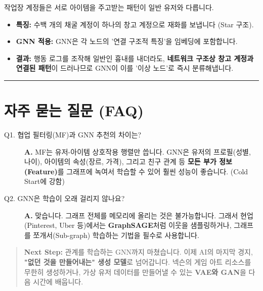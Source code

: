 \documentclass[11pt,a4paper]{book}
\theoremstyle{definition}
\begin{document}
\begin{storybox}[title={Scenario 2: 작업장 탐지 (Node Classification)}]
작업장 계정들은 서로 아이템을 주고받는 패턴이 일반 유저와 다릅니다.
\end{storybox}
\begin{itemize}
    \item \textbf{특징:} 수백 개의 채굴 계정이 하나의 창고 계정으로 재화를 보냅니다 (Star 구조).
    \item \textbf{GNN 적용:} GNN은 각 노드의 '연결 구조적 특징'을 임베딩에 포함합니다.
    \item \textbf{결과:} 행동 로그를 조작해 일반인 흉내를 내더라도, \textbf{네트워크 구조상 창고 계정과 연결된 패턴}이 드러나므로 GNN이 이를 '이상 노드'로 즉시 분류해냅니다.
\end{itemize}

\vspace{0.5cm}\hrule\vspace{0.5cm}

\section{자주 묻는 질문 (FAQ)}

\begin{description}
    \item[Q1. 협업 필터링(MF)과 GNN 추천의 차이는?]
    \textbf{A.} MF는 유저-아이템 상호작용 행렬만 씁니다. GNN은 유저의 프로필(성별, 나이), 아이템의 속성(장르, 가격), 그리고 친구 관계 등 \textbf{모든 부가 정보(Feature)}를 그래프에 녹여서 학습할 수 있어 훨씬 성능이 좋습니다. (Cold Start에 강함)
    
    \item[Q2. GNN은 학습이 오래 걸리지 않나요?]
    \textbf{A.} 맞습니다. 그래프 전체를 메모리에 올리는 것은 불가능합니다. 그래서 현업(Pinterest, Uber 등)에서는 \textbf{GraphSAGE}처럼 이웃을 샘플링하거나, 그래프를 쪼개서(Sub-graph) 학습하는 기법을 필수로 사용합니다.
\end{description}

\vspace{1cm}
\begin{quote}
\textbf{Next Step:} 관계를 학습하는 GNN까지 마쳤습니다. 이제 AI의 마지막 경지, \textbf{"없던 것을 만들어내는" 생성 모델}로 넘어갑니다. 넥슨의 게임 아트 리소스를 무한히 생성하거나, 가상 유저 데이터를 만들어낼 수 있는 \textbf{VAE와 GAN}을 다음 시간에 배웁니다.
\end{quote}
\end{document}
